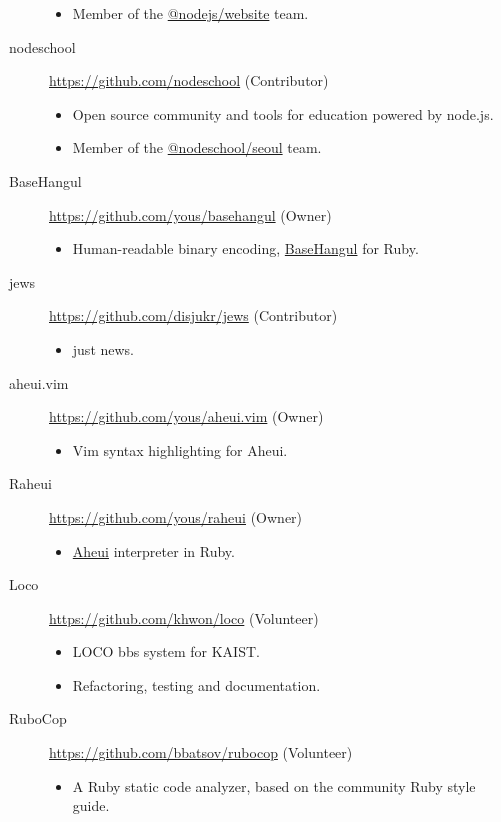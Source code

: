 \documentclass[a4paper,10pt]{article}
\begin{document}
\begin{description}
\begin{itemize}
      \item Member of the \href{https://github.com/orgs/nodejs/teams/website}{@nodejs/website} team.
    \end{itemize}
  \item[nodeschool] \url{https://github.com/nodeschool} (Contributor)
    \begin{itemize}
      \item Open source community and tools for education powered by node.js.
      \item Member of the \href{https://github.com/orgs/nodeschool/teams/seoul}{@nodeschool/seoul} team.
    \end{itemize}
  \item[BaseHangul] \url{https://github.com/yous/basehangul} (Owner)
    \begin{itemize}
      \item Human-readable binary encoding, \href{https://basehangul.github.io}{BaseHangul} for Ruby.
    \end{itemize}
  \item[jews] \url{https://github.com/disjukr/jews} (Contributor)
    \begin{itemize}
      \item just news.
    \end{itemize}
  \item[aheui.vim] \url{https://github.com/yous/aheui.vim} (Owner)
    \begin{itemize}
      \item Vim syntax highlighting for Aheui.
    \end{itemize}
  \item[Raheui] \url{https://github.com/yous/raheui} (Owner)
    \begin{itemize}
      \item \href{http://aheui.github.io}{Aheui} interpreter in Ruby.
    \end{itemize}
  \item[Loco] \url{https://github.com/khwon/loco} (Volunteer)
    \begin{itemize}
      \item LOCO bbs system for KAIST\@.
      \item Refactoring, testing and documentation.
    \end{itemize}
  \item[RuboCop] \url{https://github.com/bbatsov/rubocop} (Volunteer)
    \begin{itemize}
      \item A Ruby static code analyzer, based on the community Ruby style guide.

\end{itemize}
\end{description}
\end{document}
